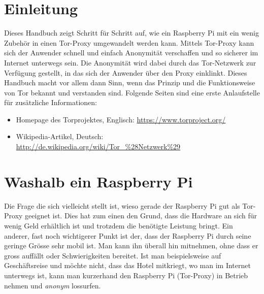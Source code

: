 \section{Einleitung}
Dieses Handbuch zeigt Schritt für Schritt auf, wie ein Raspberry Pi mit ein wenig Zubehör in einen Tor-Proxy umgewandelt werden kann. Mittels Tor-Proxy kann sich der Anwender schnell und einfach Anonymität verschaffen und so sicherer im Internet unterwegs sein. Die Anonymität wird dabei durch das Tor-Netzwerk zur Verfügung gestellt, in das sich der Anwender über den Proxy einklinkt. Dieses Handbuch macht vor allem dann Sinn, wenn das Prinzip und die Funktionsweise von Tor bekannt und verstanden sind. Folgende Seiten sind eine erste Anlaufstelle für zusätzliche Informationen: 
\begin{itemize}
\item Homepage des Torprojektes, Englisch: \url{https://www.torproject.org/}
\item Wikipedia-Artikel, Deutsch: \url{http://de.wikipedia.org/wiki/Tor_\%28Netzwerk\%29}
\end{itemize}



\section{Washalb ein Raspberry Pi}
Die Frage die sich vielleicht stellt ist, wieso gerade der Raspberry Pi gut als Tor-Proxy geeignet ist. Dies hat zum einen den Grund, dass die Hardware an sich für wenig Geld erhältlich ist und trotzdem die benötigte Leistung bringt. Ein anderer, fast noch wichtigerer Punkt ist der, dass der Raspberry Pi durch seine geringe Grösse sehr mobil ist. Man kann ihn überall hin mitnehmen, ohne dass er gross auffällt oder Schwierigkeiten bereitet. Ist man beispielsweise auf Geschäftsreise und möchte nicht, dass das Hotel mitkriegt, wo man im Internet unterwegs ist, kann man kurzerhand den Raspberry Pi (Tor-Proxy) in Betrieb nehmen und \textit{anonym} lossurfen.
